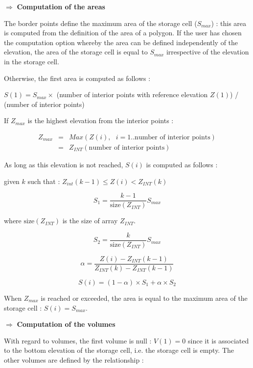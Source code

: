 $\Longrightarrow$ \textbf{Computation of the areas}

The border points define the maximum area of the storage cell ($S_{max}$) : this area is computed from the definition of the area of a polygon. If the user has chosen the computation option whereby the area can be defined independently of the elevation, the area of the storage cell is equal to $S_{max}$ irrespective of the elevation in the storage cell.

Otherwise, the first area is computed as follows :

$S(1) = S_{max} \times$ (number of interior points with reference elevation $Z(1)$) / (number of interior points)

If $Z_{max}$ is the highest elevation from the interior points :

\begin{eqnarray}
Z_{max} & = & Max(Z(i),\mbox{ }i = 1..\mbox{number of interior points}) \nonumber \\
        & = & Z_{INT}(\mbox{number of interior points}) \nonumber
\end{eqnarray}

As long as this elevation is not reached, $S(i)$ is computed as follows :

given $k$ such that : $Z_{int}(k-1) \leq Z(i) < Z_{INT}(k)$

\begin{equation}
  S_1 = \frac{k-1}{\mbox{size}(Z_{INT})}S_{max}
\end{equation}

where $\mbox{size}(Z_{INT})$ is the size of array $Z_{INT}$.

\begin{equation}
  S_2 = \frac{k}{\mbox{size}(Z_{INT})}S_{max}
\end{equation}

\begin{equation}
  \alpha = \frac{Z(i)-Z_{INT}(k-1)}{Z_{INT}(k)-Z_{INT}(k-1)}
\end{equation}

\begin{equation}
  S(i) = (1-\alpha) \times S_1 + \alpha \times S_2
\end{equation}

When $Z_{max}$ is reached or exceeded, the area is equal to the maximum area of the storage cell : $S(i) = S_{max}$.

$\Longrightarrow$ \textbf{Computation of the volumes}

With regard to volumes, the first volume is null : $V(1) = 0$ since it is associated to the bottom elevation of the storage cell, i.e. the storage cell is empty.
The other volumes are defined by the relationship :

